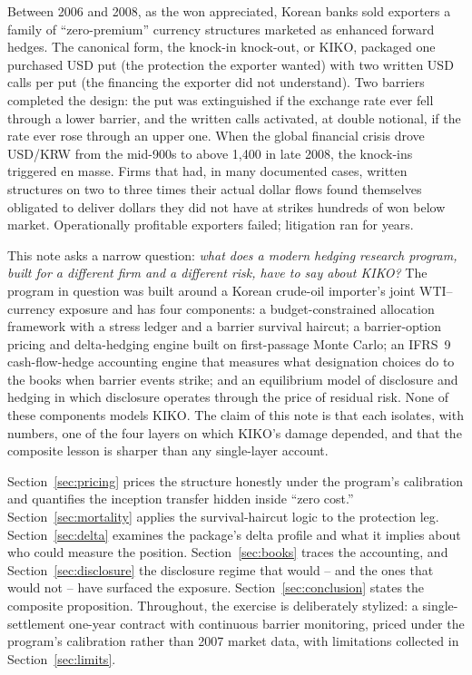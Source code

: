 \documentclass[11pt,a4paper]{article}
\begin{document}
Between 2006 and 2008, as the won appreciated, Korean banks sold exporters a family of ``zero-premium'' currency structures marketed as enhanced forward hedges. The canonical form, the knock-in knock-out, or KIKO, packaged one purchased USD put (the protection the exporter wanted) with two written USD calls per put (the financing the exporter did not understand). Two barriers completed the design: the put was extinguished if the exchange rate ever fell through a lower barrier, and the written calls activated, at double notional, if the rate ever rose through an upper one. When the global financial crisis drove USD/KRW from the mid-900s to above 1{,}400 in late 2008, the knock-ins triggered en masse. Firms that had, in many documented cases, written structures on two to three times their actual dollar flows found themselves obligated to deliver dollars they did not have at strikes hundreds of won below market. Operationally profitable exporters failed; litigation ran for years.

This note asks a narrow question: \emph{what does a modern hedging research program, built for a different firm and a different risk, have to say about KIKO?} The program in question was built around a Korean crude-oil importer's joint WTI--currency exposure and has four components: a budget-constrained allocation framework with a stress ledger and a barrier survival haircut; a barrier-option pricing and delta-hedging engine built on first-passage Monte Carlo; an IFRS~9 cash-flow-hedge accounting engine that measures what designation choices do to the books when barrier events strike; and an equilibrium model of disclosure and hedging in which disclosure operates through the price of residual risk. None of these components models KIKO. The claim of this note is that each isolates, with numbers, one of the four layers on which KIKO's damage depended, and that the composite lesson is sharper than any single-layer account.

Section~\ref{sec:pricing} prices the structure honestly under the program's calibration and quantifies the inception transfer hidden inside ``zero cost.'' Section~\ref{sec:mortality} applies the survival-haircut logic to the protection leg. Section~\ref{sec:delta} examines the package's delta profile and what it implies about who could measure the position. Section~\ref{sec:books} traces the accounting, and Section~\ref{sec:disclosure} the disclosure regime that would -- and the ones that would not -- have surfaced the exposure. Section~\ref{sec:conclusion} states the composite proposition. Throughout, the exercise is deliberately stylized: a single-settlement one-year contract with continuous barrier monitoring, priced under the program's calibration rather than 2007 market data, with limitations collected in Section~\ref{sec:limits}.
\end{document}
